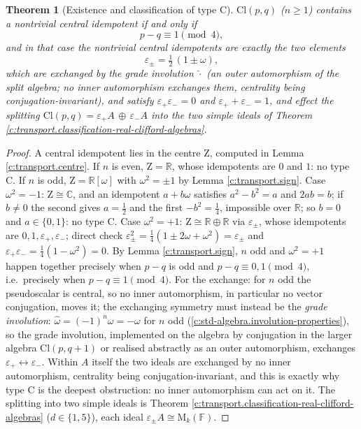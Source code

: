 \documentclass[11pt]{article}
\newtheorem{theorem}{Theorem}[section]
\theoremstyle{definition}
\theoremstyle{plain}
\providecommand{\C}{}\renewcommand{\C}{\mathbb{C}}
\providecommand{\Cl}{}\renewcommand{\Cl}{\mathrm{Cl}}
\providecommand{\Mat}{}\renewcommand{\Mat}{\mathrm{M}}
\providecommand{\R}{}\renewcommand{\R}{\mathbb{R}}
\providecommand{\Zc}{}\renewcommand{\Zc}{\mathrm{Z}}
\begin{document}
\begin{theorem}[Existence and classification of type C]\label{c:transport.existence-classification-type-c}
$\Cl(p,q)$ ($n \geq 1$) contains a nontrivial central idempotent if and only if
\[
p - q \equiv 1 \pmod 4 ,
\]
and in that case the nontrivial central idempotents are exactly the two elements
\[
\varepsilon_\pm = \tfrac12\,(1 \pm \omega),
\]
which are exchanged by the grade involution $\hat{\cdot}$ (an \emph{outer} automorphism of the split algebra; no inner automorphism exchanges them, centrality being conjugation-invariant), and satisfy $\varepsilon_+ \varepsilon_- = 0$ and $\varepsilon_+ + \varepsilon_- = 1$, and effect the splitting $\Cl(p,q) = \varepsilon_+ A \,\oplus\, \varepsilon_- A$ into the two simple ideals of Theorem \ref{c:transport.classification-real-clifford-algebras}.
\end{theorem}
\begin{proof}
A central idempotent lies in the centre $\Zc$, computed in Lemma \ref{c:transport.centre}. If $n$ is even, $\Zc = \R$, whose idempotents are $0$ and $1$: no type C. If $n$ is odd, $\Zc = \R[\omega]$ with $\omega^2 = \pm 1$ by Lemma \ref{c:transport.sign}. Case $\omega^2 = -1$: $\Zc \cong \C$, and an idempotent $a + b\omega$ satisfies $a^2 - b^2 = a$ and $2ab = b$; if $b \neq 0$ the second gives $a = \tfrac12$ and the first $-b^2 = \tfrac14$, impossible over $\R$; so $b = 0$ and $a \in \{0,1\}$: no type C. Case $\omega^2 = +1$: $\Zc \cong \R \oplus \R$ via $\varepsilon_\pm$, whose idempotents are $0, 1, \varepsilon_+, \varepsilon_-$; direct check $\varepsilon_\pm^2 = \tfrac14(1 \pm 2\omega + \omega^2) = \varepsilon_\pm$ and $\varepsilon_+\varepsilon_- = \tfrac14(1 - \omega^2) = 0$. By Lemma \ref{c:transport.sign}, $n$ odd and $\omega^2 = +1$ happen together precisely when $p - q$ is odd and $p - q \equiv 0, 1 \pmod 4$, i.e.\ precisely when $p - q \equiv 1 \pmod 4$. For the exchange: for $n$ odd the pseudoscalar is central, so no inner automorphism, in particular no vector conjugation, moves it; the exchanging symmetry must instead be the \emph{grade involution}: $\hat{\omega} = (-1)^n \omega = -\omega$ for $n$ odd (\ref{c:std-algebra.involution-properties}), so the grade involution, implemented on the algebra by conjugation in the larger algebra $\Cl(p,q{+}1)$ or realised abstractly as an outer automorphism, exchanges $\varepsilon_+ \leftrightarrow \varepsilon_-$. Within $A$ itself the two ideals are exchanged by no inner automorphism, centrality being conjugation-invariant, and this is exactly why type C is the deepest obstruction: no inner automorphism can act on it. The splitting into two simple ideals is Theorem \ref{c:transport.classification-real-clifford-algebras} ($d \in \{1,5\}$), each ideal $\varepsilon_\pm A \cong \Mat_k(\mathbb{F})$.

\end{proof}
\end{document}
